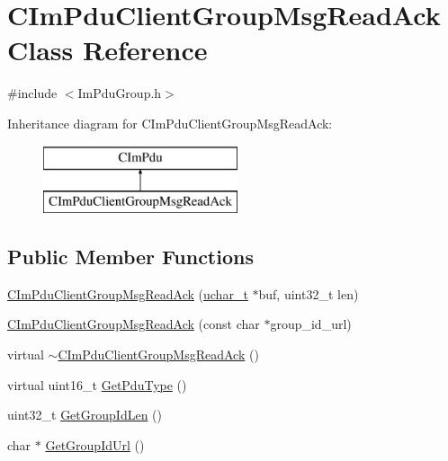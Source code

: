 \hypertarget{class_c_im_pdu_client_group_msg_read_ack}{}\section{C\+Im\+Pdu\+Client\+Group\+Msg\+Read\+Ack Class Reference}
\label{class_c_im_pdu_client_group_msg_read_ack}


{\ttfamily \#include $<$Im\+Pdu\+Group.\+h$>$}

Inheritance diagram for C\+Im\+Pdu\+Client\+Group\+Msg\+Read\+Ack\+:\begin{figure}[H]
\begin{center}
\leavevmode
\includegraphics[height=2.000000cm]{class_c_im_pdu_client_group_msg_read_ack}
\end{center}
\end{figure}
\subsection*{Public Member Functions}
\begin{DoxyCompactItemize}
\item 
\hyperlink{class_c_im_pdu_client_group_msg_read_ack_aad086403e4bf0f1ab76f688d5d81c323}{C\+Im\+Pdu\+Client\+Group\+Msg\+Read\+Ack} (\hyperlink{base_2ostype_8h_a124ea0f8f4a23a0a286b5582137f0b8d}{uchar\+\_\+t} $\ast$buf, uint32\+\_\+t len)
\item 
\hyperlink{class_c_im_pdu_client_group_msg_read_ack_ab8ff287b7422c403ebeecc01be37e2a7}{C\+Im\+Pdu\+Client\+Group\+Msg\+Read\+Ack} (const char $\ast$group\+\_\+id\+\_\+url)
\item 
virtual \hyperlink{class_c_im_pdu_client_group_msg_read_ack_afc6ca02d7f6ae504514e3236f607a47d}{$\sim$\+C\+Im\+Pdu\+Client\+Group\+Msg\+Read\+Ack} ()
\item 
virtual uint16\+\_\+t \hyperlink{class_c_im_pdu_client_group_msg_read_ack_a3d9ed97768203e7952a09e2b475922c7}{Get\+Pdu\+Type} ()
\item 
uint32\+\_\+t \hyperlink{class_c_im_pdu_client_group_msg_read_ack_a0aaac5004428a7509fb3079b132aa8a2}{Get\+Group\+Id\+Len} ()
\item 
char $\ast$ \hyperlink{class_c_im_pdu_client_group_msg_read_ack_a18a5d563ad55ff04fe89e5740dd41a42}{Get\+Group\+Id\+Url} ()
\end{DoxyCompactItemize}
